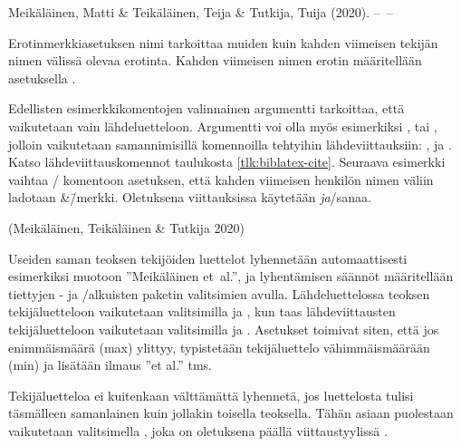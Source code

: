\begin{koodilohkosis}
\end{koodilohkosis}

\begin{tulossis}
  Meikäläinen, Matti \& Teikäläinen, Teija \& Tutkija, Tuija (2020).
  --~--
\end{tulossis}

Erotinmerkkiasetuksen nimi  tarkoittaa muiden
kuin kahden viimeisen tekijän nimen välissä olevaa erotinta. Kahden
viimeisen nimen erotin määritellään asetuksella
.

Edellisten esimerkkikomentojen valinnainen argumentti 
tarkoittaa, että vaikutetaan vain lähdeluetteloon. Argumentti voi olla
myös esimerkiksi ,  tai ,
jolloin vaikutetaan samannimisillä komennoilla tehtyihin
lähdeviittauksiin: ,  ja
. Katso lähdeviittauskomennot taulukosta
\ref{tlk:biblatex-cite}. Seuraava esimerkki vaihtaa
\-/ komentoon asetuksen, että kahden viimeisen
henkilön nimen väliin ladotaan \&\=/merkki. Oletuksena viittauksissa
käytetään \textit{ja}\-/sanaa.

\begin{koodilohkosis}
\end{koodilohkosis}

\begin{tulossis}
  (Meikäläinen, Teikäläinen \& Tutkija 2020)
\end{tulossis}

Useiden saman teoksen tekijöiden luettelot lyhennetään automaattisesti
esimerkiksi muotoon ''Meikäläinen et~al.'', ja lyhentämisen säännöt
määritellään tiettyjen - ja \-/alkuisten paketin
valitsimien avulla. Lähdeluettelossa teoksen tekijäluetteloon
vaikutetaan valitsimilla  ja
, kun taas lähdeviittausten tekijäluetteloon
vaikutetaan valitsimilla  ja
. Asetukset toimivat siten, että jos
enimmäismäärä (max) ylittyy, typistetään tekijäluettelo vähimmäismäärään
(min) ja lisätään ilmaus ''et al.'' tms.

Tekijäluetteloa ei kuitenkaan välttämättä lyhennetä, jos luettelosta
tulisi täsmälleen samanlainen kuin jollakin toisella teoksella. Tähän
asiaan puolestaan vaikutetaan valitsimella , joka on
oletuksena päällä viittaustyylissä .

